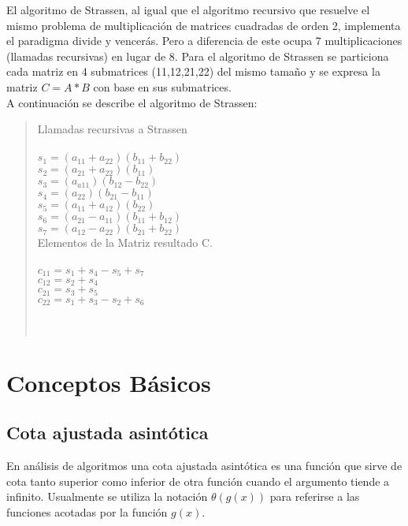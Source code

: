 \documentclass[a4paper]{article}
\begin{document}
    El algoritmo de Strassen, al igual que el algoritmo recursivo que resuelve el mismo problema de multiplicación de matrices cuadradas de orden 2, implementa el paradigma divide y vencerás. Pero a diferencia de este ocupa 7 multiplicaciones (llamadas recursivas) en lugar de 8. Para el algoritmo de Strassen se particiona cada matriz en 4 submatrices (11,12,21,22) del mismo tamaño y se expresa la matriz $C=A*B$ con base en sus submatrices.\\ \noindent A continuación se describe el algoritmo de Strassen:\cite{cota} \clearpage
    \begin{multicols}{2}
    \begin{quote}
    Llamadas recursivas a Strassen\\\\
    $s_1 = (a_{11} + a_{22} )( b_{11} + b_{22} )$\\
    $s_2 = (a_{21} + a_{22} )( b_{11} )$\\
    $s_3 = (a_{a11})( b_{12} - b_{22} )$\\
    $s_4 = (a_{22})( b_{21} - b_{11} )$\\
    $s_5 = (a_{11} + a_{12} )( b_{22} )$\\
    $s_6 = (a_{21} - a_{11} )( b_{11} + b_{12} )$\\
    $s_7 = (a_{12} - a_{22} )( b_{21} + b_{22} )$\\
    
    Elementos de la Matriz resultado C.\\\\
    $c_{11} = s_1 + s_4 - s_5 + s_7$\\
    $c_{12} = s_2 + s_4$\\
    $c_{21} = s_3 + s_5$\\
    $c_{22} = s_1 + s_3 - s_2 + s_6$\\\\\\
    \end{quote}
    \end{multicols} 


\section{Conceptos Básicos}
\label{sec:concep}
\subsection{Cota ajustada asintótica}
En análisis de algoritmos una cota ajustada asintótica es una función que sirve de cota tanto superior como inferior de otra función cuando el argumento tiende a infinito. Usualmente se utiliza la notación $\theta(g(x))$ para referirse a las funciones acotadas por la función $g(x)$.\cite{cota}
\end{document}
